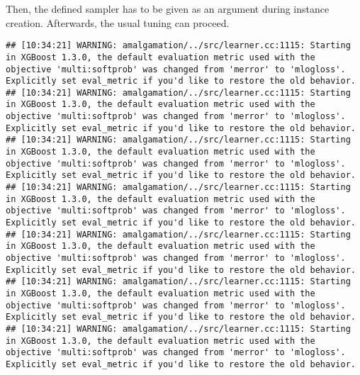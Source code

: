 \documentclass[
]{scrbook}
\newenvironment{Shaded}{\begin{snugshade}}{\end{snugshade}}
\newcommand{\AttributeTok}[1]{\textcolor[rgb]{0.77,0.63,0.00}{#1}}
\newcommand{\DecValTok}[1]{\textcolor[rgb]{0.00,0.00,0.81}{#1}}
\newcommand{\FunctionTok}[1]{\textcolor[rgb]{0.00,0.00,0.00}{#1}}
\newcommand{\NormalTok}[1]{#1}
\newcommand{\OtherTok}[1]{\textcolor[rgb]{0.56,0.35,0.01}{#1}}
\newcommand{\SpecialCharTok}[1]{\textcolor[rgb]{0.00,0.00,0.00}{#1}}
\newcommand{\StringTok}[1]{\textcolor[rgb]{0.31,0.60,0.02}{#1}}
\renewenvironment{Shaded} {\begin{snugshade}\small} {\end{snugshade}}
\begin{document}
Then, the defined sampler has to be given as an argument during instance creation.
Afterwards, the usual tuning can proceed.

\begin{Shaded}
\end{Shaded}

\begin{verbatim}
## [10:34:21] WARNING: amalgamation/../src/learner.cc:1115: Starting in XGBoost 1.3.0, the default evaluation metric used with the objective 'multi:softprob' was changed from 'merror' to 'mlogloss'. Explicitly set eval_metric if you'd like to restore the old behavior.
## [10:34:21] WARNING: amalgamation/../src/learner.cc:1115: Starting in XGBoost 1.3.0, the default evaluation metric used with the objective 'multi:softprob' was changed from 'merror' to 'mlogloss'. Explicitly set eval_metric if you'd like to restore the old behavior.
## [10:34:21] WARNING: amalgamation/../src/learner.cc:1115: Starting in XGBoost 1.3.0, the default evaluation metric used with the objective 'multi:softprob' was changed from 'merror' to 'mlogloss'. Explicitly set eval_metric if you'd like to restore the old behavior.
## [10:34:21] WARNING: amalgamation/../src/learner.cc:1115: Starting in XGBoost 1.3.0, the default evaluation metric used with the objective 'multi:softprob' was changed from 'merror' to 'mlogloss'. Explicitly set eval_metric if you'd like to restore the old behavior.
## [10:34:21] WARNING: amalgamation/../src/learner.cc:1115: Starting in XGBoost 1.3.0, the default evaluation metric used with the objective 'multi:softprob' was changed from 'merror' to 'mlogloss'. Explicitly set eval_metric if you'd like to restore the old behavior.
## [10:34:21] WARNING: amalgamation/../src/learner.cc:1115: Starting in XGBoost 1.3.0, the default evaluation metric used with the objective 'multi:softprob' was changed from 'merror' to 'mlogloss'. Explicitly set eval_metric if you'd like to restore the old behavior.
## [10:34:21] WARNING: amalgamation/../src/learner.cc:1115: Starting in XGBoost 1.3.0, the default evaluation metric used with the objective 'multi:softprob' was changed from 'merror' to 'mlogloss'. Explicitly set eval_metric if you'd like to restore the old behavior.

\end{verbatim}
\end{document}
